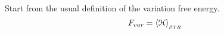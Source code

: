\documentclass[../main/main.tex]{subfiles}
\begin{document}

Start from the usual definition of the variation free energy.
\begin{equation}
  F_{var} = \expval{\mathcal{H}}_{\rho _{TR}} 
\end{equation}
\end{document}
